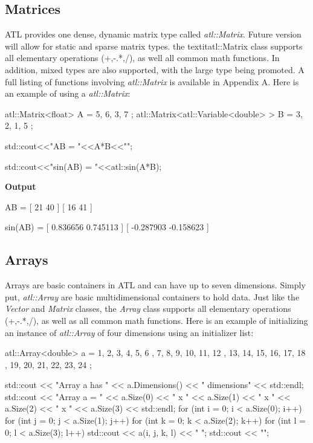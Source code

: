 \documentclass[12pt,a4paper]{article}
\begin{document}
\subsection{Matrices}
ATL provides one dense, dynamic matrix type called \textit{atl::Matrix}. Future version will allow for static and sparse matrix types. the textit{atl::Matrix} class supports all elementary operations (+,-.*,/), as well all common math functions. In addition, mixed types are also supported, with the large type being promoted. A full listing of functions involving \textit{atl::Matrix} is available in Appendix A. Here is an example of using a \textit{atl::Matrix}:
\begin{cppsource}
 
    atl::Matrix<float> A = {
        {5, 6},
        {3, 7}
    };
    atl::Matrix<atl::Variable<double> > B = {
        {3, 2},
        {1, 5}
    };

    std::cout<<"AB = \n"<<A*B<<"\n";
    
    std::cout<<"sin(AB) = \n"<<atl::sin(A*B);
  
\end{cppsource}
\textbf{Output}
\begin{myoutput}

AB = 
[ 21 40 ]
[ 16 41 ]

sin(AB) = 
[ 0.836656 0.745113 ]
[ -0.287903 -0.158623 ]


\end{myoutput}

\subsection{Arrays}
Arrays are basic containers in ATL and can have up to seven dimensions.   Simply put, \textit{atl::Array} are basic multidimensional containers to hold data. Just like the \textit{Vector} and \textit{Matrix} classes, the \textit{Array} class supports all elementary operations (+,-.*,/), as well as all common math functions. Here is an example of initializing an instance of \textit{atl::Array} of four dimensions using an initializer list:
\begin{cppsource}

  atl::Array<double> a = {
        {
            {
                {1, 2, 3},
                {4, 5, 6}
            },
            {
                {7, 8, 9},
                {10, 11, 12}
            }
        },
        {
            {
                {13, 14, 15},
                {16, 17, 18}
            },
            {
                {19, 20, 21},
                {22, 23, 24}
            }
        }
    };

    std::cout << "Array a has " << a.Dimensions() << " dimensions" << std::endl;
    std::cout << "Array a = " << a.Size(0) << " x " << a.Size(1) 
                  << " x " << a.Size(2) << " x " << a.Size(3) << std::endl;
    for (int i = 0; i < a.Size(0); i++) {
        for (int j = 0; j < a.Size(1); j++) {
            for (int k = 0; k < a.Size(2); k++) {
                for (int l = 0; l < a.Size(3); l++) {
                    std::cout << a(i, j, k, l) << " ";
                }
                std::cout << "\n";
            }
        }
    }
 \end{cppsource}   
 
\end{document}
